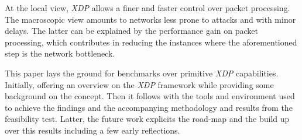 At the local view, \textit{XDP} allows a finer and faster control over packet processing. 
The macroscopic view amounts to networks less prone to attacks and with minor delays.
The latter can be explained by the performance gain on packet processing, which contributes in reducing the instances where the aforementioned step is the network bottleneck.

This paper lays the ground for benchmarks over primitive \textit{XDP} capabilities.
Initially, offering an overview on the \textit{XDP} framework while providing some background on the concept.
Then it follows with the tools and environment used to achieve the findings and the accompanying methodology and results from the feasibility test.
Latter, the future work explicits the road-map and the build up over this results including a few early reflections.

%
%
